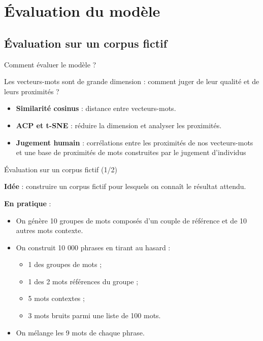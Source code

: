\documentclass[10pt,xcolor=table,color={dvipsnames,usenames},ignorenonframetext,usepdftitle=false,french]{beamer}
\begin{document}
\hypertarget{uxe9valuation-du-moduxe8le}{%
\section{Évaluation du modèle}\label{uxe9valuation-du-moduxe8le}}

\hypertarget{uxe9valuation-sur-un-corpus-fictif}{%
\subsection{Évaluation sur un corpus
fictif}\label{uxe9valuation-sur-un-corpus-fictif}}

\begin{frame}{Comment évaluer le modèle ?}
\protect\hypertarget{comment-uxe9valuer-le-moduxe8le}{}

Les vecteurs-mots sont de grande dimension : comment juger de leur
qualité et de leurs proximités ?

\begin{itemize}
\item
  \textbf{Similarité cosinus} : distance entre vecteurs-mots.
\item
  \textbf{ACP et t-SNE} : réduire la dimension et analyser les
  proximités.
\item
  \textbf{Jugement humain} : corrélations entre les proximités de nos
  vecteurs-mots et une base de proximités de mots construites par le
  jugement d’individus
\end{itemize}

\end{frame}

\begin{frame}{Évaluation sur un corpus fictif (1/2)}
\protect\hypertarget{uxe9valuation-sur-un-corpus-fictif-12}{}

\textbf{Idée} : construire un corpus fictif pour lesquels on connaît le
résultat attendu.

\textbf{En pratique} :

\begin{itemize}
\item On génère 10 groupes de mots composés d'un couple de référence et de 10 autres mots contexte.
\item On construit 10 000 phrases en tirant au hasard :
\begin{itemize}
\item 1 des groupes de mots ;
\item 1 des 2 mots \og références \fg{} du groupe ;
\item 5 mots contextes ;
\item 3 mots bruits parmi une liste de 100 mots.
\end{itemize}
\item On mélange les 9 mots de chaque phrase.
\end{itemize}

\end{frame}
\end{document}
